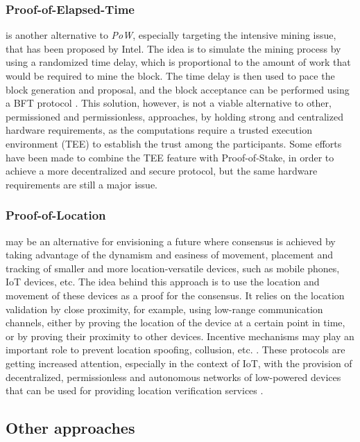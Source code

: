 \documentclass[journal]{IEEEtran}
\begin{document}
\subsubsection{Proof-of-Elapsed-Time} is another alternative to \emph{PoW},
especially targeting the intensive mining issue, that has been proposed 
by Intel. The idea is to simulate the mining process by using a
randomized time delay, which is proportional to the amount of work
that would be required to mine the block. The time delay is then used to pace the
block generation and proposal, and the block acceptance can be performed
using a BFT protocol \cite{olson2018sawtooth}. This solution, however,
is not a viable alternative to other, permissioned and permissionless, approaches, 
by holding strong and centralized hardware requirements, 
as the computations require a trusted execution environment
(TEE) to establish the trust among the participants. Some efforts have been made
to combine the TEE feature with Proof-of-Stake, in order to achieve a
more decentralized and secure protocol, but the 
same hardware requirements are still a major issue.

\subsubsection{Proof-of-Location} may be an alternative for envisioning a future where
consensus is achieved by taking advantage of the dynamism and easiness of movement, placement and 
tracking of smaller and more location-versatile devices, such as mobile phones, IoT devices, etc.
The idea behind this approach is to use the location and movement of these devices 
as a proof for the consensus. It relies on the location validation by close proximity, 
for example, using low-range communication channels, either by proving the location
of the device at a certain point in time, or by proving their proximity to other devices.
Incentive mechanisms may play an important role to prevent location spoofing, collusion, etc. \cite{natoli2019deconstructing}.
These protocols are getting increased attention, especially in the context of IoT, 
with the provision of decentralized, permissionless and autonomous networks of 
low-powered devices that can be used for providing location verification services \cite{9376868}.

\subsection{Other approaches}
\end{document}
